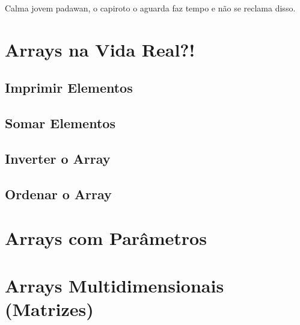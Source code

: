 
Calma jovem padawan, o capiroto o aguarda faz tempo e não se reclama disso.



\section{Arrays na Vida Real?!}
\subsection{Imprimir Elementos}
\subsection{Somar Elementos}
\subsection{Inverter o Array}
\subsection{Ordenar o Array}

\section{Arrays com Parâmetros}

\section{Arrays Multidimensionais (Matrizes)}


